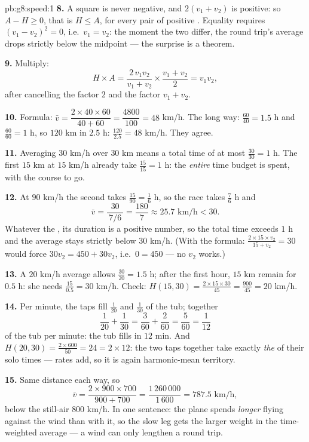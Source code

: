\begin{solution}{pb:g8:speed:1}
\textbf{8.} A square is never negative, and $2(v_1 + v_2)$ is
positive: so $A - H \geq 0$, that is $H \leq A$, for every pair
of positive . Equality requires $(v_1 - v_2)^2 = 0$, i.e.\
$v_1 = v_2$: the moment the two  differ, the round trip's
average drops strictly below the midpoint --- the surprise is a
theorem.

\textbf{9.} Multiply:
\[
H \times A
= \frac{2\, v_1 v_2}{v_1 + v_2} \times \frac{v_1 + v_2}{2}
= v_1 v_2 ,
\]
after cancelling the factor $2$ and the factor $v_1 + v_2$.

\textbf{10.} Formula: $\bar v = \dfrac{2 \times 40 \times 60}
{40 + 60} = \dfrac{4800}{100} = 48$ km/h. The long way:
$\frac{60}{40} = 1.5$ h and $\frac{60}{60} = 1$ h, so $120$ km in
$2.5$ h: $\frac{120}{2.5} = 48$ km/h. They agree.

\textbf{11.} Averaging $30$ km/h over $30$ km means a total time
of at most $\frac{30}{30} = 1$ h. The first $15$ km at $15$ km/h
already take $\frac{15}{15} = 1$ h: the \emph{entire} time budget
is spent, with \omterm{def:g3:division:half}{half} the course to go.

\textbf{12.} At $90$ km/h the second  takes
$\frac{15}{90} = \frac16$ h, so the race takes $\frac76$ h and
\[
\bar v = \frac{30}{\ 7/6\ } = \frac{180}{7} \approx 25.7
\text{ km/h} < 30 .
\]
Whatever the  , its duration is a positive
number, so the total time exceeds $1$ h and the average stays
strictly below $30$ km/h. (With the formula: $\frac{2 \times 15
\times v_2}{15 + v_2} = 30$ would force $30 v_2 = 450 + 30 v_2$,
i.e.\ $0 = 450$ --- no \omterm{def:g8:speed:def}{speed} $v_2$ works.)

\textbf{13.} A $20$ km/h average allows $\frac{30}{20} = 1.5$ h;
after the first hour, $15$ km remain for $0.5$ h: she needs
$\frac{15}{0.5} = 30$ km/h. Check:
$H(15, 30) = \frac{2 \times 15 \times 30}{45} = \frac{900}{45}
= 20$ km/h.

\textbf{14.} Per minute, the taps fill $\frac{1}{20}$ and
$\frac{1}{30}$ of the tub; together
\[
\frac{1}{20} + \frac{1}{30}
= \frac{3}{60} + \frac{2}{60}
= \frac{5}{60} = \frac{1}{12}
\]
of the tub per minute: the tub fills in $12$ min. And
$H(20, 30) = \frac{2 \times 600}{50} = 24 = 2 \times 12$: the two
taps together take exactly \emph{ the } of their
solo times --- rates add, so it is again harmonic-mean territory.

\textbf{15.} Same distance each way, so
\[
\bar v = \frac{2 \times 900 \times 700}{900 + 700}
= \frac{1\,260\,000}{1\,600} = 787.5 \text{ km/h},
\]
below the still-air $800$ km/h. In one sentence: the plane spends
\emph{longer} flying against the wind than with it, so the slow
leg gets the larger weight in the time-weighted average --- a
wind can only lengthen a round trip.
\end{solution}
